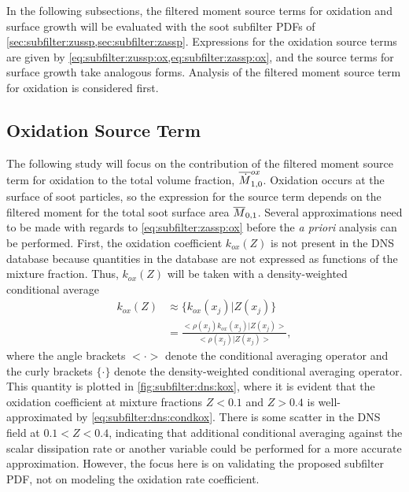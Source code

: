 In the following subsections, the filtered moment source terms for oxidation and surface growth will be evaluated with the soot subfilter PDFs of \cref{sec:subfilter:zussp,sec:subfilter:zassp}. Expressions for the oxidation source terms are given by \cref{eq:subfilter:zussp:ox,eq:subfilter:zassp:ox}, and the source terms for surface growth take analogous forms. Analysis of the filtered moment source term for oxidation is considered first.

\subsection{Oxidation Source Term}
\label{sec:subfilter:dns:ox}

The following study will focus on the contribution of the filtered moment source term for oxidation to the total volume fraction, $\fst[M]{1,0}^{ox}$. Oxidation occurs at the surface of soot particles, so the expression for the source term depends on the filtered moment for the total soot surface area $\mean{M}_{0,1}$. Several approximations need to be made with regards to \cref{eq:subfilter:zassp:ox} before the \textit{a priori} analysis can be performed. First, the oxidation coefficient $k_{ox}(Z)$ is not present in the DNS database because quantities in the database are not expressed as functions of the mixture fraction. Thus, $k_{ox}(Z)$ will be taken with a density-weighted conditional average
\begin{equation}\label{eq:subfilter:dns:condkox}
  \begin{split}
    k_{ox}(Z) &\approx \{ k_{ox}(x_j)|Z(x_j) \} \\
    &= \frac{<\rho(x_j)k_{ox}(x_j)|Z(x_j)>}{<\rho(x_j)|Z(x_j)>},
  \end{split}
\end{equation}
where the angle brackets $< \cdot >$ denote the conditional averaging operator and the curly brackets $\{ \cdot \}$ denote the density-weighted conditional averaging operator. This quantity is plotted in \cref{fig:subfilter:dns:kox}, where it is evident that the oxidation coefficient at mixture fractions $Z < 0.1$ and $Z > 0.4$ is well-approximated by \cref{eq:subfilter:dns:condkox}. There is some scatter in the DNS field at $0.1 < Z < 0.4$, indicating that additional conditional averaging against the scalar dissipation rate or another variable could be performed for a more accurate approximation. However, the focus here is on validating the proposed subfilter PDF, not on modeling the oxidation rate coefficient.

